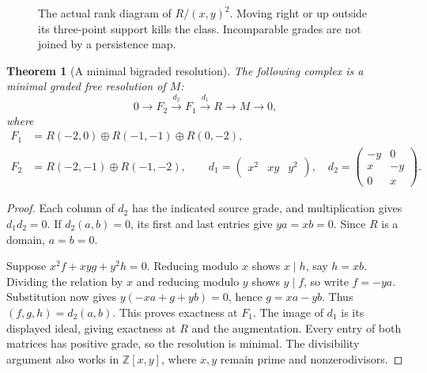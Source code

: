 \documentclass[11pt,oneside,openany]{book}
\newtheorem{theorem}{Theorem}[chapter]
\theoremstyle{definition}\newtheorem{definition}[theorem]{Definition}
\theoremstyle{remark}\newtheorem{remark}[theorem]{Remark}
\begin{document}
\begin{figure}[htbp]\centering
{}
\caption{The actual rank diagram of $R/(x,y)^2$. Moving right or up outside
its three-point support kills the class. Incomparable grades are not joined
by a persistence map.}\label{pers:rankfigure}
\end{figure}

\begin{theorem}[A minimal bigraded resolution]\label{pers:resolution}
The following complex is a minimal graded free resolution of $M$:
\[
 0\longrightarrow F_2\xrightarrow{d_2}F_1\xrightarrow{d_1}R
       \longrightarrow M\longrightarrow0,
\]
where
\[
 \begin{split}
 F_1&=R(-2,0)\oplus R(-1,-1)\oplus R(0,-2),\\
 F_2&=R(-2,-1)\oplus R(-1,-2),\qquad
 d_1=\begin{pmatrix}x^2&xy&y^2\end{pmatrix},\quad
 d_2=\begin{pmatrix}-y&0\\x&-y\\0&x\end{pmatrix}.
 \end{split}
\]
\end{theorem}
\begin{proof}
Each column of $d_2$ has the indicated source grade, and multiplication
gives $d_1d_2=0$. If $d_2(a,b)=0$, its first and last entries give
$ya=xb=0$. Since $R$ is a domain, $a=b=0$.

Suppose $x^2f+xyg+y^2h=0$. Reducing modulo $x$ shows $x\mid h$,
say $h=xb$. Dividing the relation by $x$ and reducing modulo $y$
shows $y\mid f$, so write $f=-ya$. Substitution now gives
$y(-xa+g+yb)=0$, hence $g=xa-yb$. Thus
$(f,g,h)=d_2(a,b)$. This proves exactness at $F_1$. The image of
$d_1$ is its displayed ideal, giving exactness at $R$ and the
augmentation. Every entry of both matrices has positive grade, so the
resolution is minimal. The divisibility argument also works in
$\mathbb Z[x,y]$, where $x,y$ remain prime and nonzerodivisors.
\end{proof}
\end{document}
